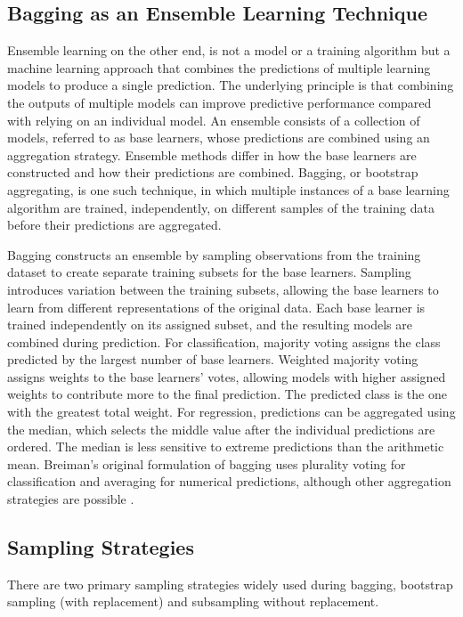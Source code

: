 \documentclass[conference, 10pt]{IEEEtran}
\begin{document}
\subsection{Bagging as an Ensemble Learning Technique} 
Ensemble learning on the other end, is not a model or a training algorithm but a machine learning approach 
that combines the predictions of multiple learning models to produce a single prediction. The underlying 
principle is that combining the outputs of multiple models can improve predictive performance compared with 
relying on an individual model. An ensemble consists of a collection of models, referred to as base learners, 
whose predictions are combined using an aggregation strategy. Ensemble methods differ in how the base learners 
are constructed and how their predictions are combined. Bagging, or bootstrap aggregating, is one such technique, 
in which multiple instances of a base learning algorithm are trained, independently, on different samples of the 
training data before their predictions are aggregated. \cite{DBLP:conf/mcs/Dietterich00}

Bagging constructs an ensemble by sampling observations from the training dataset to create separate training 
subsets for the base learners. Sampling introduces variation between the training subsets, allowing the base 
learners to learn from different representations of the original data. Each base learner is trained independently 
on its assigned subset, and the resulting models are combined during prediction. For classification, majority voting 
assigns the class predicted by the largest number of base learners. Weighted majority voting assigns weights to the 
base learners' votes, allowing models with higher assigned weights to contribute more to the final prediction. 
The predicted class is the one with the greatest total weight. For regression, predictions can be aggregated using 
the median, which selects the middle value after the individual predictions are ordered. The median is less sensitive 
to extreme predictions than the arithmetic mean. Breiman's original formulation of bagging uses plurality voting for 
classification and averaging for numerical predictions, although other aggregation strategies are possible 
\cite{DBLP:journals/ml/Breiman96b}.

\subsection{Sampling Strategies}
There are two primary sampling strategies widely used during bagging, bootstrap sampling (with replacement) and 
subsampling without replacement. 
\end{document}
